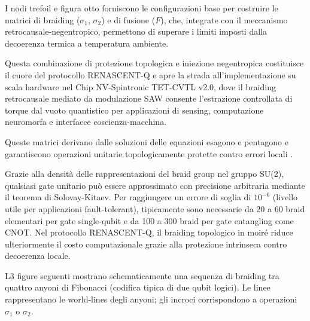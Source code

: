 \documentclass[11pt,a4paper]{article}
\let\oldcite\cite
\renewcommand{\cite}{\protect\oldcite}
\theoremstyle{plain}
\theoremstyle{definition}
\begin{document}
I nodi trefoil e figura otto forniscono le configurazioni base per costruire le matrici di braiding ($\sigma_1$, $\sigma_2$) e di fusione ($F$), che, integrate con il meccanismo retrocausale-negentropico, permettono di superare i limiti imposti dalla decoerenza termica a temperatura ambiente.


\vspace{0.3cm}


Questa combinazione di protezione topologica e iniezione negentropica costituisce il cuore del protocollo RENASCENT-Q e apre la strada all'implementazione su scala hardware nel Chip NV-Spintronic TET-CVTL v2.0, dove il braiding retrocausale mediato da modulazione SAW consente l'estrazione controllata di torque dal vuoto quantistico per applicazioni di sensing, computazione neuromorfa e interfacce coscienza-macchina.







\vspace{0.5cm}





Queste matrici derivano dalle soluzioni delle equazioni esagono e pentagono e garantiscono operazioni unitarie topologicamente protette contro errori locali \cite{Trebst2008, Xu2024}. 


\clearpage


Grazie alla densità delle rappresentazioni del braid group nel gruppo SU(2), qualsiasi gate unitario può essere approssimato con precisione arbitraria mediante il teorema di Solovay-Kitaev. Per raggiungere un errore di soglia di $10^{-6}$ (livello utile per applicazioni fault-tolerant), tipicamente sono necessarie da 20 a 60 braid elementari per gate single-qubit e da 100 a 300 braid per gate entangling come CNOT. Nel protocollo RENASCENT-Q, il braiding topologico in moiré riduce ulteriormente il costo computazionale grazie alla protezione intrinseca contro decoerenza locale.

L3 figure seguenti mostrano schematicamente una sequenza di braiding tra quattro anyoni di Fibonacci (codifica tipica di due qubit logici). Le linee rappresentano le world-lines degli anyoni; gli incroci corrispondono a operazioni $\sigma_1$ o $\sigma_2$.
\end{document}
